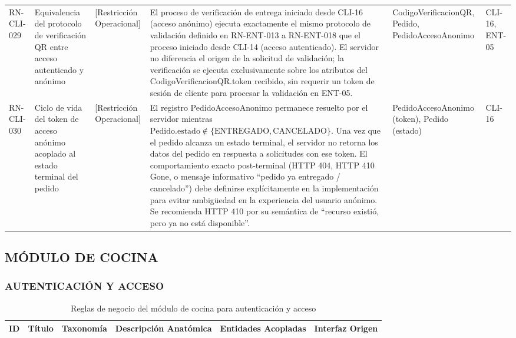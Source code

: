 \begin{landscape}
\begin{longtable}[c]{l p{2.1cm} p{2.1cm} p{8cm} p{4cm} p{3cm}}
\addlinespace
RN-CLI-029 & Equivalencia del protocolo de verificación QR entre acceso autenticado y anónimo & [Restricción Operacional] & El proceso de verificación de entrega iniciado desde CLI-16 (acceso anónimo) ejecuta exactamente el mismo protocolo de validación definido en RN-ENT-013 a RN-ENT-018 que el proceso iniciado desde CLI-14 (acceso autenticado). El servidor no diferencia el origen de la solicitud de validación; la verificación se ejecuta exclusivamente sobre los atributos del CodigoVerificacionQR.token recibido, sin requerir un token de sesión de cliente para procesar la validación en ENT-05. & CodigoVerificacionQR, Pedido, PedidoAccesoAnonimo & CLI-16, ENT-05 \\
\addlinespace
RN-CLI-030 & Ciclo de vida del token de acceso anónimo acoplado al estado terminal del pedido & [Restricción Operacional] & El registro PedidoAccesoAnonimo permanece resuelto por el servidor mientras $\text{Pedido.estado} \notin \{\text{ENTREGADO}, \text{CANCELADO}\}$. Una vez que el pedido alcanza un estado terminal, el servidor no retorna los datos del pedido en respuesta a solicitudes con ese token. El comportamiento exacto post-terminal (HTTP 404, HTTP 410 Gone, o mensaje informativo ``pedido ya entregado / cancelado'') debe definirse explícitamente en la implementación para evitar ambigüedad en la experiencia del usuario anónimo. Se recomienda HTTP 410 por su semántica de ``recurso existió, pero ya no está disponible''. & PedidoAccesoAnonimo (token), Pedido (estado) & CLI-16 \\
\end{longtable}
\endgroup

\subsection{MÓDULO DE COCINA}
\subsubsection{AUTENTICACIÓN Y ACCESO}
\begingroup
\setlength{\LTleft}{\fill}
\setlength{\LTright}{\fill}

\begin{longtable}[c]{l p{2.1cm} p{2.1cm} p{8cm} p{4cm} p{3cm}}
\caption{Reglas de negocio del módulo de cocina para autenticación y acceso} \label{tab:reglas-negocio-cocina-autenticacion-acceso}\\
\toprule
\textbf{ID} & \textbf{Título} & \textbf{Taxonomía} & \textbf{Descripción Anatómica} & \textbf{Entidades Acopladas} & \textbf{Interfaz Origen} \\
\midrule
\endfirsthead


\end{longtable}
\end{landscape}
